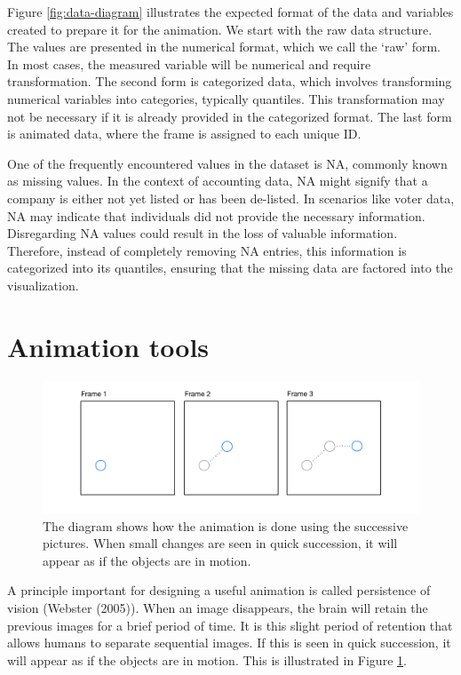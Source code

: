 Figure \ref{fig:data-diagram} illustrates the expected format of the data and variables created to prepare it for the animation. We start with the raw data structure. The values are presented in the numerical format, which we call the `raw' form. In most cases, the measured variable will be numerical and require transformation. The second form is categorized data, which involves transforming numerical variables into categories, typically quantiles. This transformation may not be necessary if it is already provided in the categorized format. The last form is animated data, where the frame is assigned to each unique ID.

One of the frequently encountered values in the dataset is NA, commonly known as missing values. In the context of accounting data, NA might signify that a company is either not yet listed or has been de-listed. In scenarios like voter data, NA may indicate that individuals did not provide the necessary information. Disregarding NA values could result in the loss of valuable information. Therefore, instead of completely removing NA entries, this information is categorized into its quantiles, ensuring that the missing data are factored into the visualization.

\hypertarget{animation}{%
\section{Animation tools}\label{animation}}

\begin{figure}

{\centering \includegraphics[width=1\linewidth]{figures/animation-diagram} 

}

\caption{The diagram shows how the animation is done using the successive pictures. When small changes are seen in quick succession, it will appear as if the objects are in motion.}\label{fig:animation-diagram}
\end{figure}

A principle important for designing a useful animation is called persistence of vision (Webster (2005)). When an image disappears, the brain will retain the previous images for a brief period of time. It is this slight period of retention that allows humans to separate sequential images. If this is seen in quick succession, it will appear as if the objects are in motion. This is illustrated in Figure \ref{fig:animation-diagram}.

